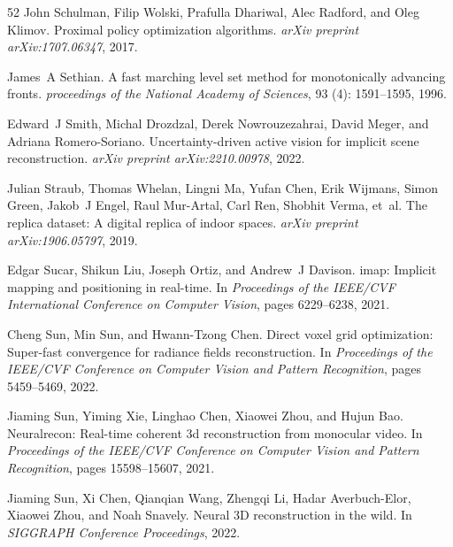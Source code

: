 \documentclass[10pt,twocolumn,letterpaper]{article}
\begin{document}
{\begin{thebibliography}{52}
John Schulman, Filip Wolski, Prafulla Dhariwal, Alec Radford, and Oleg Klimov.
\newblock Proximal policy optimization algorithms.
\newblock \emph{arXiv preprint arXiv:1707.06347}, 2017.

James~A Sethian.
\newblock A fast marching level set method for monotonically advancing fronts.
\newblock \emph{proceedings of the National Academy of Sciences}, 93 (4): 1591--1595, 1996.

Edward~J Smith, Michal Drozdzal, Derek Nowrouzezahrai, David Meger, and Adriana Romero-Soriano.
\newblock Uncertainty-driven active vision for implicit scene reconstruction.
\newblock \emph{arXiv preprint arXiv:2210.00978}, 2022.

Julian Straub, Thomas Whelan, Lingni Ma, Yufan Chen, Erik Wijmans, Simon Green, Jakob~J Engel, Raul Mur-Artal, Carl Ren, Shobhit Verma, et~al.
\newblock The replica dataset: A digital replica of indoor spaces.
\newblock \emph{arXiv preprint arXiv:1906.05797}, 2019.

Edgar Sucar, Shikun Liu, Joseph Ortiz, and Andrew~J Davison.
\newblock imap: Implicit mapping and positioning in real-time.
\newblock In \emph{Proceedings of the IEEE/CVF International Conference on Computer Vision}, pages 6229--6238, 2021.

Cheng Sun, Min Sun, and Hwann-Tzong Chen.
\newblock Direct voxel grid optimization: Super-fast convergence for radiance fields reconstruction.
\newblock In \emph{Proceedings of the IEEE/CVF Conference on Computer Vision and Pattern Recognition}, pages 5459--5469, 2022{}.

Jiaming Sun, Yiming Xie, Linghao Chen, Xiaowei Zhou, and Hujun Bao.
\newblock Neuralrecon: Real-time coherent 3d reconstruction from monocular video.
\newblock In \emph{Proceedings of the IEEE/CVF Conference on Computer Vision and Pattern Recognition}, pages 15598--15607, 2021.

Jiaming Sun, Xi Chen, Qianqian Wang, Zhengqi Li, Hadar Averbuch-Elor, Xiaowei Zhou, and Noah Snavely.
\newblock Neural {3D} reconstruction in the wild.
\newblock In \emph{SIGGRAPH Conference Proceedings}, 2022{}.


\end{thebibliography}}
\end{document}
